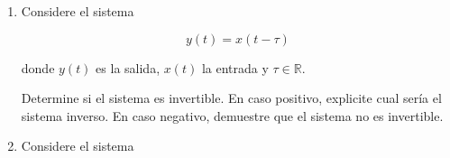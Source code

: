 \documentclass[letterpaper, 12pt]{article}
\newif\ifanswers
\begin{document}
\begin{enumerate}
{    }

        \fi

    \item  Considere el sistema

    $$
    y(t)=x(t-\tau)
    $$
    
    donde $y(t)$ es la salida, $x(t)$ la entrada y $\tau \in \mathbb{R}$.
    
    Determine si el sistema es invertible. En caso positivo, explicite cual sería el sistema inverso. En caso negativo, demuestre que el sistema no es invertible.

    \ifanswers
    {\color{red}
    \textbf{Solución: }

    (a) Observando que el sistema todo lo que hace es desplazar la señal de entrada en una cantidad $\tau$ hacia la derecha, el sistema inverso tiene que ser aquel que desplaza la señal la misma cantidad hacia la izquierda y vuelve a centrar la entrada en su posición original, es decir
        
        $$
        y^{-1}(t)=x(t+\tau) 
        $$
        
        Por lo tanto el sistema es invertible $\rightarrow 1$ pt. Esta es la respuesta corta e intuitiva.
        
        La respuesta formal, es la siguiente. Observamos que el sistema se puede describir por la convolución $y=x * \delta_{\tau}$, donde $\delta_{\tau}$ denota un impulso desfasado en $\tau$. Deducimos entonces que la respuesta al impulso del sistema es
        
        $$
        h=\delta_{\tau}
        $$
        
        Para que el sistema sea invertible, tiene que cumplirse $h * h^{-1}=\delta$. Usando las propiedaes de la convolución del impulso, entonces queda claro que:
        
        $$
        h^{-1}=\delta_{-\tau} 
        $$
        
        dado que
        
        $$
        \delta_{\tau} * \delta_{-\tau}=\delta
        $$
        
        Entonces concluímos que
        
        $$
        y^{-1}(t)=x(t+\tau)
        $$
    
    }
    \fi

    \item Considere el sistema


\end{enumerate}
\end{document}
